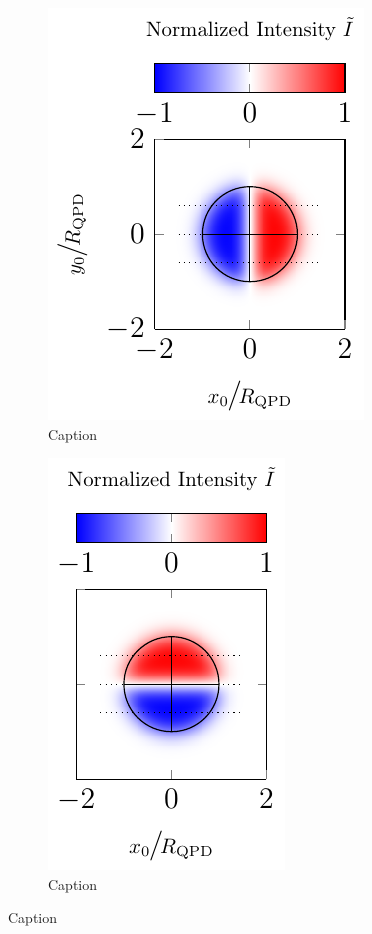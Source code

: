 \lipsum[1-5]
\begin{figure}
  \centering
  \begin{subfigure}[b]{0.35\textwidth}
    \centering
    \includegraphics[]{Plots/cache/QPDx.pdf}
    \caption{Caption}
    \label{fig:T_xQPD}
  \end{subfigure}
  \hfill
  \begin{subfigure}[b]{0.3\textwidth}
    \centering
    \includegraphics[]{Plots/cache/QPDy.pdf}
    \caption{Caption}

\end{subfigure}
\end{figure}
